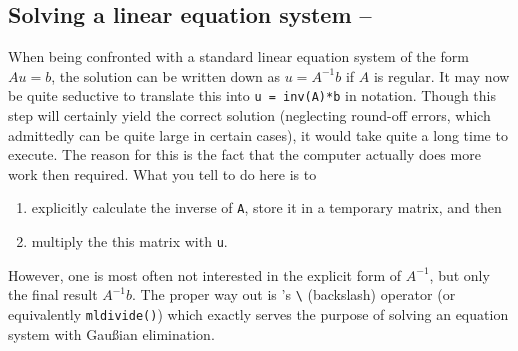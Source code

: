 
%
%


\subsection{Solving a linear equation system -- \cleansymbol\cleansymbol\fastsymbol\fastsymbol\fastsymbol}
When being confronted with a standard linear equation system of the form
$Au=b$, the solution can be written down as $u = A^{-1}b$ if $A$ is regular. It
may now be quite seductive to translate this into \lstinline!u = inv(A)*b! in
\matlab{} notation. Though this step will certainly yield the correct solution
(neglecting round-off errors, which admittedly can be quite large in certain
cases), it would take quite a long time to execute. The reason for this is the
fact that the computer actually does more work then required. What you tell
\matlab{} to do here is to
\begin{enumerate}
\item explicitly calculate the inverse of \lstinline!A!, store it in a temporary matrix, and then
\item multiply the this matrix with \lstinline!u!.
\end{enumerate}
However, one is most often not interested in the explicit form of $A^{-1}$, but
only the final result $A^{-1}b$. The proper way out is \matlab{}'s
\lstinline!\! (backslash) operator (or equivalently \lstinline!mldivide()!)
which exactly serves the purpose of solving an equation system with Gau{\ss}ian
elimination.


